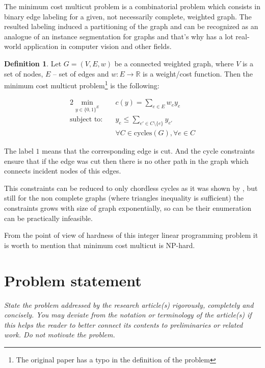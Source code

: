 \documentclass[10pt, twocolumn, a4paper]{article}
\theoremstyle{definition}
\newtheorem{definition}{Definition}
\begin{document}
The minimum cost multicut problem is a combinatorial problem which consists in binary
edge labeling for a given, not necessarily complete, weighted graph. The resulted labeling induced
a partitioning of the graph and can be recognized as an analogue of an instance segmentation for graphs and
that's why has a lot real-world application in computer vision and other fields.

\begin{definition}
    Let $G = (V, E, w)$ be a connected weighted graph, where $V$ is a set of nodes, $E$ -- set of edges and
    $w: E \to \mathbb{R}$ is a weight/cost function. Then the minimum cost multicut
    problem\footnote{The original paper has a typo in the definition of the problem}
    is the following:

    \begin{alignat*}{2}
        \min_{y \in \{0, 1\}^E} \quad &
        c(y) = \sum\limits_{e \in E} w_e y_e                                            \\
        \text{subject to:}      \quad &
        y_e \leq \sum\limits_{e' \in C \setminus \{e\}} y_{e'}                          \\
                                      & \forall C \in \text{cycles}(G), \forall e \in C
    \end{alignat*}
\end{definition}

The label $1$ means that the corresponding edge is cut.
And the cycle constraints ensure that if the edge was cut then there is no other path in the graph which connects
incident nodes of this edges.

This constraints can be reduced to only chordless cycles as it was shown by \citet{chopra1993partition}, but still for the
non complete graphs (where triangles inequality is sufficient) the constraints grows with size of graph exponentially, so can be
their enumeration can be practically infeasible.

From the point of view of hardness of this integer linear programming problem it is worth to mention that minimum cost multicut
is NP-hard.


\section{Problem statement}

\emph{State the problem addressed by the research article(s) rigorously, completely and concisely.
    You may deviate from the notation or terminology of the article(s) if this helps the reader to better connect its contents to preliminaries or related work.
    Do not motivate the problem.}
\end{document}
